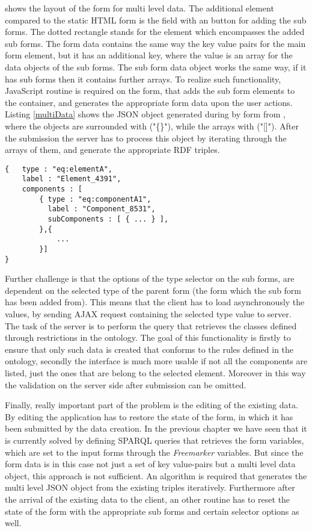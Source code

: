  shows the layout of the form for multi level data. The additional element compared to the static HTML form is the field with an button for adding the sub forms. The dotted rectangle stands for the element which encompasses the added sub forms. The form data contains the same way the key value pairs for the main form element, but it has an additional key, where the value is an array for the data objects of the sub forms. The sub form data object works the same way, if it has sub forms then it contains further arrays. To realize such functionality, JavaScript routine is required on the form, that adds the sub form elements to the container, and generates the appropriate form data upon the user actions. Listing \ref{multiData} shows the JSON object generated during by form from , where the objects are surrounded with ("\{\}"), while the arrays with ("[]"). After the submission the server has to process this object by iterating through the arrays of them, and generate the appropriate RDF triples.

\begin{lstlisting}[basicstyle=\footnotesize, frame=single, caption={Multi level form data in JSON}, label=multiData, captionpos=b, belowskip=1em, aboveskip=2em]
{	type : "eq:elementA",
	label : "Element_4391",
	components : [
		{ type : "eq:componentA1",
		  label : "Component_8531",	
		  subComponents : [ { ... } ],
		},{ 
			... 
		}]
}
\end{lstlisting}

Further challenge is that the options of the type selector on the sub forms, are dependent on the selected type of the parent form (the form which the sub form has been added from). This means that the client has to load asynchronously the values, by sending AJAX request containing the selected type value to server. The task of the server is to perform the query that retrieves the classes defined through restrictions in the ontology. The goal of this functionality is firstly to ensure that only such data is created that conforms to the rules defined in the ontology, secondly the interface is much more usable if not all the components are listed, just the ones that are belong to the selected element. Moreover in this way the validation on the server side after submission can be omitted.

Finally, really important part of the problem is the editing of the existing data. By editing the application has to restore the state of the form, in which it has been submitted by the data creation. In the previous chapter we have seen that it is currently solved by defining  SPARQL queries that retrieves the form variables, which are set to the input forms through the \textit{Freemarker} variables. But since the form data is in this case not just a set of key value-pairs but a multi level data object, this approach is not sufficient. An algorithm is required that generates the multi level JSON object from the existing triples iteratively. Furthermore after the arrival of the existing data to the client, an other routine has to reset the state of the form with the appropriate sub forms and certain selector options as well.

